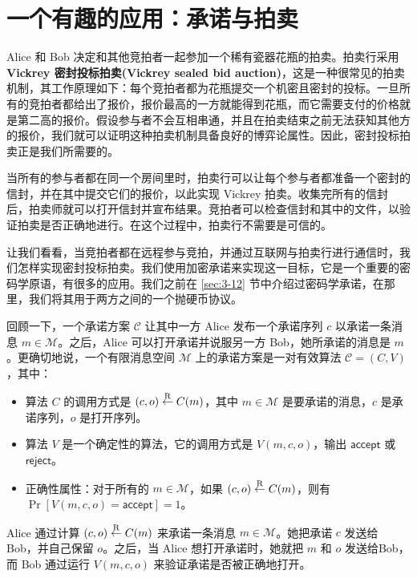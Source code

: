 \section{一个有趣的应用：承诺与拍卖}\label{sec:8-12}

Alice 和 Bob 决定和其他竞拍者一起参加一个稀有瓷器花瓶的拍卖。拍卖行采用\textbf{Vickrey 密封投标拍卖(Vickrey sealed bid auction)}，这是一种很常见的拍卖机制，其工作原理如下：每个竞拍者都为花瓶提交一个机密且密封的投标。一旦所有的竞拍者都给出了报价，报价最高的一方就能得到花瓶，而它需要支付的价格就是第二高的报价。假设参与者不会互相串通，并且在拍卖结束之前无法获知其他方的报价，我们就可以证明这种拍卖机制具备良好的博弈论属性。因此，密封投标拍卖正是我们所需要的。

当所有的参与者都在同一个房间里时，拍卖行可以让每个参与者都准备一个密封的信封，并在其中提交它们的报价，以此实现 Vickrey 拍卖。收集完所有的信封后，拍卖师就可以打开信封并宣布结果。竞拍者可以检查信封和其中的文件，以验证拍卖是否正确地进行。在这个过程中，拍卖行不需要是可信的。

让我们看看，当竞拍者都在远程参与竞拍，并通过互联网与拍卖行进行通信时，我们怎样实现密封投标拍卖。我们使用加密承诺来实现这一目标，它是一个重要的密码学原语，有很多的应用。我们之前在 \ref{sec:3-12} 节中介绍过密码学承诺，在那里，我们将其用于两方之间的一个抛硬币协议。

回顾一下，一个承诺方案 $\mathcal{C}$ 让其中一方 Alice 发布一个承诺序列 $c$ 以承诺一条消息 $m\in\mathcal{M}$。之后，Alice 可以打开承诺并说服另一方 Bob，她所承诺的消息是 $m$。更确切地说，一个有限消息空间 $\mathcal{M}$ 上的承诺方案是一对有效算法 $\mathcal{C}=(C,V)$，其中：
\begin{itemize}
	\item 算法 $C$ 的调用方式是 $(c,o)\overset{\rm R}\leftarrow C(m)$，其中 $m\in\mathcal{M}$ 是要承诺的消息，$c$ 是承诺序列，$o$ 是打开序列。
	\item 算法 $V$ 是一个确定性的算法，它的调用方式是 $V(m,c,o)$，输出 $\mathsf{accept}$ 或 $\mathsf{reject}$。
	\item 正确性属性：对于所有的 $m\in\mathcal{M}$，如果 $(c,o)\overset{\rm R}\leftarrow C(m)$，则有 $\Pr[V(m,c,o)=\mathsf{accept}]=1$。
\end{itemize}
Alice 通过计算 $(c,o)\overset{\rm R}\leftarrow C(m)$ 来承诺一条消息 $m\in\mathcal{M}$。她把承诺 $c$ 发送给 Bob，并自己保留 $o$。之后，当 Alice 想打开承诺时，她就把 $m$ 和 $o$ 发送给Bob，而 Bob 通过运行 $V(m,c,o)$ 来验证承诺是否被正确地打开。

